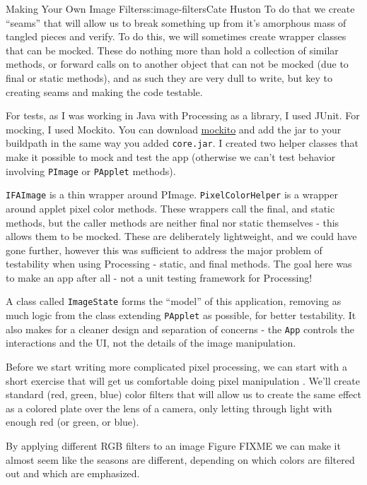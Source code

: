 \begin{aosachapter}{Making Your Own Image Filters}{s:image-filters}{Cate Huston}
To do that we create ``seams'' that will allow us to break something up
from it's amorphous mass of tangled pieces and verify. To do this, we
will sometimes create wrapper classes that can be mocked. These do
nothing more than hold a collection of similar methods, or forward calls
on to another object that can not be mocked (due to final or static
methods), and as such they are very dull to write, but key to creating
seams and making the code testable.

For tests, as I was working in Java with Processing as a library, I used
JUnit. For mocking, I used Mockito. You can download
\href{https://code.google.com/p/mockito/downloads/list}{mockito} and add
the jar to your buildpath in the same way you added \texttt{core.jar}. I
created two helper classes that make it possible to mock and test the
app (otherwise we can't test behavior involving \texttt{PImage} or
\texttt{PApplet} methods).

\texttt{IFAImage} is a thin wrapper around PImage.
\texttt{PixelColorHelper} is a wrapper around applet pixel color
methods. These wrappers call the final, and static methods, but the
caller methods are neither final nor static themselves - this allows
them to be mocked. These are deliberately lightweight, and we could have
gone further, however this was sufficient to address the major problem
of testability when using Processing - static, and final methods. The
goal here was to make an app after all - not a unit testing framework
for Processing!

A class called \texttt{ImageState} forms the ``model'' of this
application, removing as much logic from the class extending
\texttt{PApplet} as possible, for better testability. It also makes for
a cleaner design and separation of concerns - the \texttt{App} controls
the interactions and the UI, not the details of the image manipulation.

\label{do-it-yourself-filters}

\label{rgb-filters}

Before we start writing more complicated pixel processing, we can start
with a short exercise that will get us comfortable doing pixel
manipulation . We'll create standard (red, green, blue) color filters
that will allow us to create the same effect as a colored plate over the
lens of a camera, only letting through light with enough red (or green,
or blue).

By applying different RGB filters to an image Figure FIXME we can make
it almost seem like the seasons are different, depending on which colors
are filtered out and which are emphasized.


\end{aosachapter}
